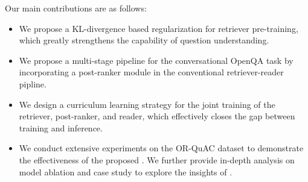 Our main contributions are as follows:
\begin{itemize}
    \item We propose a KL-divergence based regularization for retriever pre-training, which greatly strengthens the capability of question understanding.
    \item We propose a multi-stage pipeline for the conversational OpenQA task by incorporating a post-ranker module in the conventional retriever-reader pipline.
    \item We design a curriculum learning strategy for the joint training of the retriever, post-ranker, and reader, which effectively closes the gap between training and inference. 
    \item We conduct extensive experiments on the OR-QuAC dataset to demonstrate the effectiveness of the proposed {\modelname}. We further provide in-depth analysis on model ablation and case study to explore the insights of {\modelname}.
\end{itemize}


